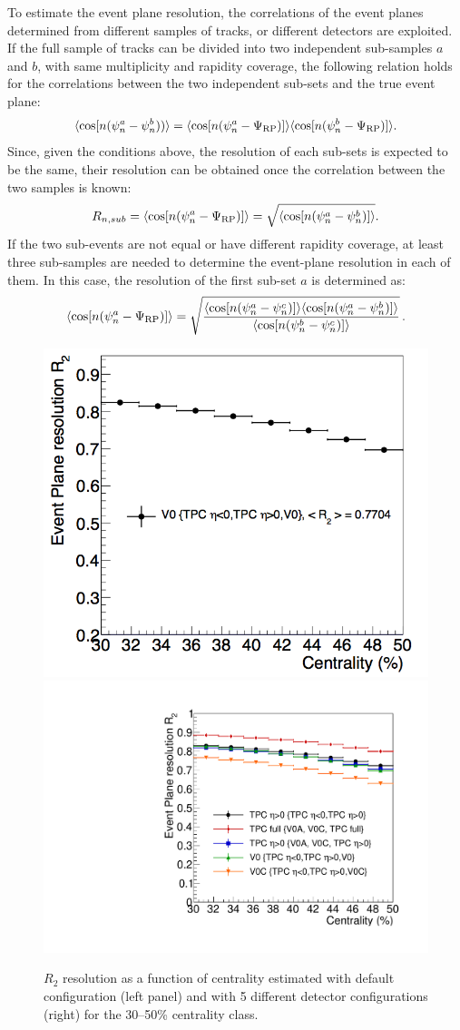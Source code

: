 To estimate the event plane resolution, the correlations of the event planes determined
from different samples of tracks, or different detectors are exploited.
If the full sample of tracks can be divided into two independent sub-samples 
$a$ and $b$, with same multiplicity and rapidity coverage,
the following relation holds for the correlations between the
two independent sub-sets and the true event plane:
\begin{equation}
\langle {\rm cos} [n({\rm \psi}^a_n-{\rm \psi}^b_n)) \rangle = 
\langle {\rm cos} [n({\rm \psi}^a_n-{\rm \Psi}_{\rm RP})] \rangle \langle {\rm cos} [n({\rm \psi}^b_n-{\rm \Psi}_{\rm RP})] \rangle .
\end{equation}
Since, given the conditions above, the resolution of each sub-sets is expected 
to be the same, their resolution can be obtained 
once the correlation between the two samples is known:
\begin{equation}
R_{n, sub} = \langle {\rm cos} [n({\rm \psi}^a_n-{\rm \Psi}_{\rm RP})] \rangle = \sqrt{\langle {\rm cos} [n({\rm \psi}^a_n-{\rm \psi}^b_n)] \rangle}.
\end{equation}
If the two sub-events are not equal or have different rapidity coverage,
at least three sub-samples are needed to determine the 
event-plane resolution in each of them. In this case, 
the resolution of the first sub-set $a$ is determined as:
\begin{equation}
 \langle {\rm cos} [n({\rm \psi}^a_n-{\rm \Psi}_{\rm RP})] \rangle = 
\sqrt{\frac{\langle\cos [n(\psi_n^a-\psi_n^c)] \rangle \langle\cos [n(\psi_n^a-\psi_n^b)] \rangle}{\langle\cos [n(\psi_n^b-\psi_n^c)] \rangle}}\, .
\end{equation}

\begin{figure}
\centering
  \includegraphics[width=.49\textwidth]{FigCap5/resoEP3050.png}
  \includegraphics[width=.49\textwidth]{FigCap5/EPresolution_comparison.pdf}
\caption{$R_2$ resolution as a function of centrality estimated with default configuration (left panel) and with 5 different detector configurations (right) for the 30--50\% centrality class.}
\label{fig:resoVsDetConfig}
\end{figure}

